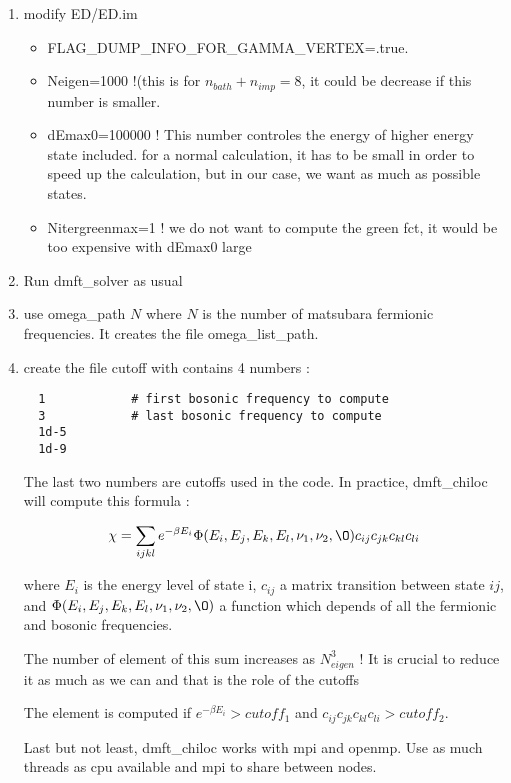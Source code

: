 \documentclass{book}
\def\b{\beta}
\def\v{\nu}
\begin{document}
\begin{enumerate}
\item modify ED/ED.im
  \begin{itemize}
  \item FLAG\_DUMP\_INFO\_FOR\_GAMMA\_VERTEX=.true.
  \item Neigen=1000 !(this is for $n_{bath}+n_{imp} = 8$, it could be decrease if this number is smaller.
  \item dEmax0=100000 !  This number controles the energy of higher energy state included. for a normal calculation, it has to be small in order to speed up the calculation, but in our case, we want as much as possible states.
  \item  Nitergreenmax=1 ! we do not want to compute the green fct, it would be too expensive with  dEmax0 large
  \end{itemize}

\item Run dmft\_solver as usual

\item use omega\_path $N$ where $N$ is the number of matsubara fermionic frequencies. It creates the file omega\_list\_path.

\item create the file cutoff with contains 4 numbers :

\begin{lstlisting}
  1            # first bosonic frequency to compute
  3            # last bosonic frequency to compute
  1d-5
  1d-9
\end{lstlisting}
The last two numbers are cutoffs used in the code.
In practice, dmft\_chiloc will  compute this formula :

\begin{equation}
  \chi = \sum_{ijkl} e^{-\b E_i} \Phi(E_i,E_j,E_k,E_l,\v_1,\v_2,\O) c_{ij}c_{jk}c_{kl}c_{li}
\end{equation}

where $E_i$ is the energy level of state i,  $c_{ij}$ a matrix transition between state $ij$, and  $ \Phi(E_i,E_j,E_k,E_l,\v_1,\v_2,\O)$ a function which depends of all the fermionic and bosonic frequencies.

The number of element of this sum increases as $N_{eigen}^3$ ! It is crucial to reduce it as much as we can and that is the role of the cutoffs

The element is computed if $e^{-\b E_i} >cutoff_1$ and $c_{ij}c_{jk}c_{kl}c_{li} >cutoff_2$.


Last but not least, dmft\_chiloc works with mpi and openmp. Use as much threads as cpu available  and mpi to share between nodes.



\end{enumerate}
\end{document}

